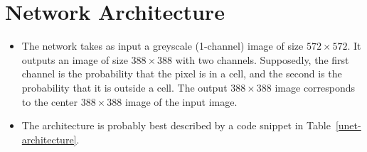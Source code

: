 \documentclass[10pt]{article}
\begin{document}
  \section{Network Architecture}

  \begin{itemize}
  	\item The network takes as input a greyscale (1-channel) image of size $572 \times 572$. It outputs an image of size $388 \times 388$ with two channels. Supposedly, the first channel is the probability that the pixel is in a cell, and the second is the probability that it is outside a cell. The output $388 \times 388$ image corresponds to the center $388 \times 388$ image of the input image.

  	\item The architecture is probably best described by a code snippet in Table~\ref{unet-architecture}.


\end{itemize}
\end{document}
